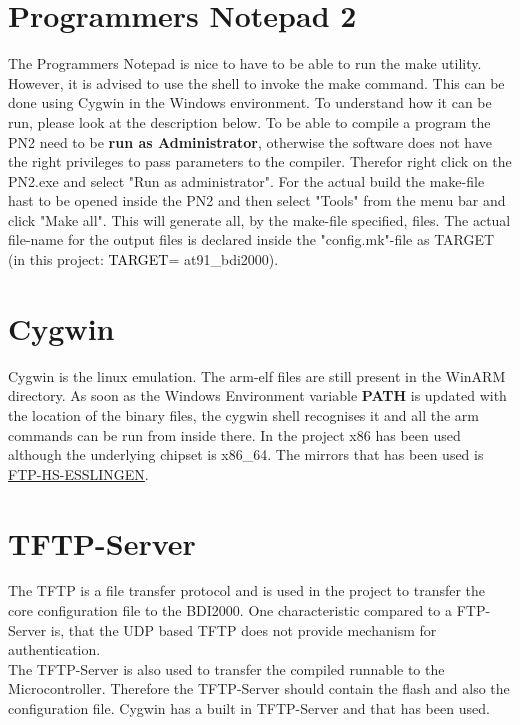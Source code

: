 \section{Programmers Notepad 2}
The Programmers Notepad is nice to have to be able to run the make utility. However, it is advised to use the shell to invoke the make command. This can be done using Cygwin in the Windows environment. To understand how it can be run, please look at the description below.
To be able to compile a program the \ac{PN2} need to be \textbf{run as Administrator}, otherwise the software does not have the right privileges to pass parameters to the compiler. Therefor right click on the \ac{PN2}.exe and select "Run as administrator". For the actual build the make-file hast to be opened inside the \ac{PN2} and then select "Tools" from the menu bar and click "Make all". This will generate all, by the make-file specified, files. The actual file-name for the output files is declared inside the "config.mk"-file as TARGET (in this project: {\textcolor{black}{TARGET}}= at91\_bdi2000).\\

\section{Cygwin}
Cygwin is the linux emulation. The arm-elf files are still present in the WinARM directory. As soon as the Windows Environment variable \textbf{PATH} is updated with the location of the binary files, the cygwin shell recognises it and all the arm commands can be run from inside there. In the project x86 has been used although the underlying chipset is x86\_64. The mirrors that has been used is \href{http://ftp-stud.hs-esslingen.de/pub/Mirrors/sources.redhat.com/cygwin/x86/}{FTP-HS-ESSLINGEN}. \\

\section{TFTP-Server} 
The \ac{TFTP} is a file transfer protocol and is used in the project to transfer the core configuration file to the BDI2000. One characteristic compared to a FTP-Server is, that the \ac{UDP} based \ac{TFTP} does not provide mechanism for authentication.\cite{TFTPWIKI}\\
The \ac{TFTP}-Server is also used to transfer the compiled runnable to the Microcontroller. Therefore the \ac{TFTP}-Server should contain the flash and also the configuration file. Cygwin has a built in \ac{TFTP}-Server and that has been used. \\


